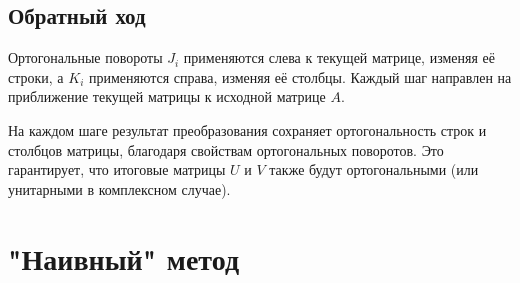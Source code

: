 \subsection{Обратный ход}


Ортогональные повороты \( J_i \) применяются слева к текущей матрице, изменяя её строки, а \( K_i \) применяются справа, изменяя её столбцы. Каждый шаг направлен на приближение текущей матрицы к исходной матрице \( A \).

На каждом шаге результат преобразования сохраняет ортогональность строк и столбцов матрицы, благодаря свойствам ортогональных поворотов. Это гарантирует, что итоговые матрицы \( U \) и \( V \) также будут ортогональными (или унитарными в комплексном случае).




\newpage
\section{"Наивный" метод}




